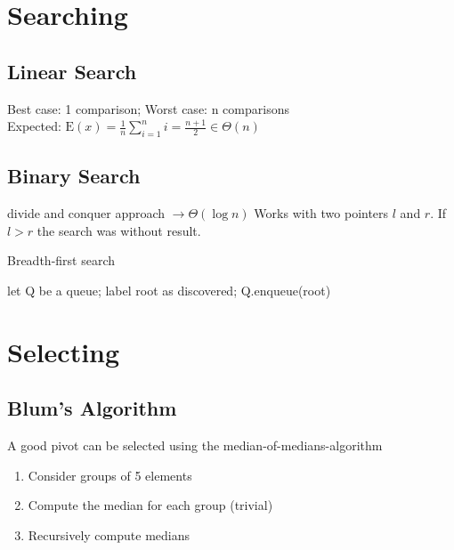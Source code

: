 \documentclass[10pt,landscape,a4paper, table]{extarticle}
\begin{document}
\begin{multicols*}{3}
\section{Searching}

\subsection{Linear Search}

Best case: 1 comparison; 
Worst case: n comparisons\\
Expected: $\mathrm{E}(x) = \frac{1}{n}\sum_{i=1}^n i = \frac{n+1}{2} \in \Theta(n)$

\subsection{Binary Search}
divide and conquer approach $\rightarrow \Theta(\log n)$
Works with two pointers $l$ and $r$. If $l > r$ the search was without result.

{\scriptsize
\begin{algorithm}[H]
    \caption{Breadth-first search}
    \label{FWAlgorithm}
    \SetAlgoLined
    let Q be a queue; label root as discovered; Q.enqueue(root)\\
\end{algorithm}}

\section{Selecting}

\subsection{Blum's Algorithm}
A good pivot can be selected using the median-of-medians-algorithm

\begin{enumerate}
    \item Consider groups of 5 elements
    \item Compute the median for each group (trivial)
    \item Recursively compute medians
\end{enumerate}


\end{multicols*}
\end{document}
